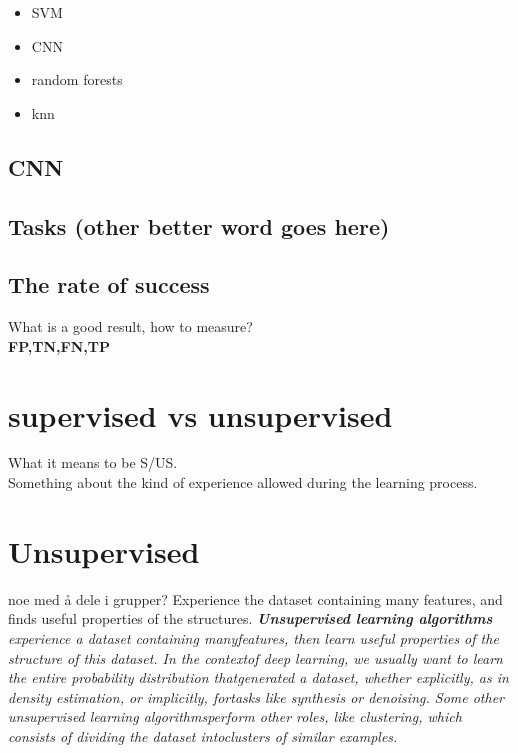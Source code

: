 \documentclass[a4paper,english]{ifimaster}
\begin{document}
	  \begin{itemize}
	    \item SVM 
	    \item CNN 
	    \item random forests
	    \item knn
	  \end{itemize}
	  
	  \subsection{CNN}
	   
	  
	  
	  
	  
	  
	
	
	
	
	  \subsection{Tasks (other better word goes here)}
\label{chap:Tasks}

\subsection{The rate of success}
What is a good result, how to measure?\\
\textbf{FP,TN,FN,TP}\\


\section{supervised vs unsupervised}
What it means to be S/US.\\
Something about the kind of experience allowed during the learning process.


\section{Unsupervised}
noe med å dele i grupper?
Experience the dataset containing many features, and finds useful properties of the structures. 
\textit{\textbf{Unsupervised learning algorithms} experience a dataset containing manyfeatures, then learn useful properties of the structure of this dataset. In the contextof deep learning, we usually want to learn the entire probability distribution thatgenerated a dataset, whether explicitly, as in density estimation, or implicitly, fortasks like synthesis or denoising. Some other unsupervised learning algorithmsperform other roles, like clustering, which consists of dividing the dataset intoclusters of similar examples.}
\cite{Goodfellow-et-al-2016}
\end{document}
